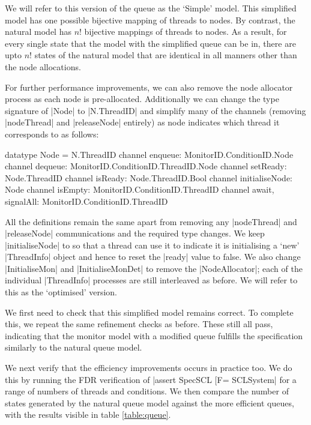 We will refer to this version of the queue as the `Simple' model. This simplified model has one possible bijective mapping of threads to nodes. By contrast, the natural model has $n!$ bijective mappings of threads to nodes. As a result, for every single state that the model with the simplified queue can be in, there are upto $n!$ states of the natural model that are identical in all manners other than the node allocations.

For further performance improvements, we can also remove the node allocator process as each node is pre-allocated. Additionally we can change the type signature of |Node| to |N.ThreadID| and simplify many of the channels (removing |nodeThread| and |releaseNode| entirely) as node indicates which thread it corresponds to as follows:

\begin{cspm}
  datatype Node = N.ThreadID
  channel enqueue: MonitorID.ConditionID.Node 
  channel dequeue: MonitorID.ConditionID.ThreadID.Node
  channel setReady: Node.ThreadID
  channel isReady: Node.ThreadID.Bool
  channel initialiseNode: Node
  channel isEmpty: MonitorID.ConditionID.ThreadID
  channel await, signalAll: MonitorID.ConditionID.ThreadID
\end{cspm}

All the definitions remain the same apart from removing any |nodeThread| and |releaseNode| communications and the required type changes. We keep |initialiseNode| to so that a thread can use it to indicate it is initialising a `new' |ThreadInfo| object and hence to reset the |ready| value to false. We also change |InitialiseMon| and |InitialiseMonDet| to remove the |NodeAllocator|; each of the individual |ThreadInfo| processes are still interleaved as before. We will refer to this as the `optimised' version.

We first need to check that this simplified model remains correct. To complete this, we repeat the same refinement checks as before. These still all pass, indicating that the monitor model with a modified queue fulfills the specification similarly to the natural queue model.

We next verify that the efficiency improvements occurs in practice too. We do this by running the FDR verification of |assert SpecSCL [F= SCLSystem| for a range of numbers of threads and conditions. We then compare the number of states generated by the natural queue model against the more efficient queues, with the results visible in table \ref{table:queue}.

